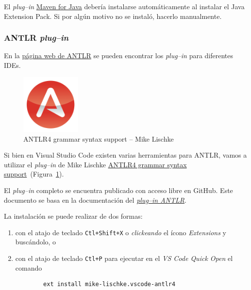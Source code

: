 El \emph{plug--in} \href{https://marketplace.visualstudio.com/items?itemName=vscjava.vscode-maven}{Maven for Java} debería instalarse automáticamente al instalar el Java Extension Pack.  Si por algún motivo no se instaló, hacerlo manualmente.


\subsubsection{ANTLR \emph{plug--in}}
\label{pluginANTLR}

En la \href{https://www.antlr.org/tools.html}{página web de ANTLR} se pueden encontrar los \emph{plug--in} para diferentes IDEs.

\begin{figure}[t]
	\centering
	\includegraphics[width=3cm]{img/IconoANTLRvscode}
	\caption{ANTLR4 grammar syntax support -- Mike Lischke}
	\label{icono}
\end{figure}

Si bien en Visual Studio Code existen varias herramientas para ANTLR, vamos a utilizar el \emph{plug--in} de Mike Lischke \href{https://marketplace.visualstudio.com/items?itemName=mike-lischke.vscode-antlr4}{ANTLR4 grammar syntax support}~(Figura~\ref{icono}).

El \emph{plug--in} completo se encuentra publicado con acceso libre en GitHub.  Este documento se basa en la documentación del \href{https://github.com/mike-lischke/vscode-antlr4/tree/master/doc}{\emph{plug--in ANTLR}}.


La instalación se puede realizar de dos formas:
\begin{enumerate}
	\item con el atajo de teclado \verb|Ctl+Shift+X| o \emph{clickeando} el ícono \emph{Extensions} y buscándolo, o
    \item con el atajo de teclado \verb|Ctl+P| para ejecutar en el \emph{VS Code Quick Open} el comando
    \begin{verbatim}
		ext install mike-lischke.vscode-antlr4
	\end{verbatim}
\end{enumerate}

